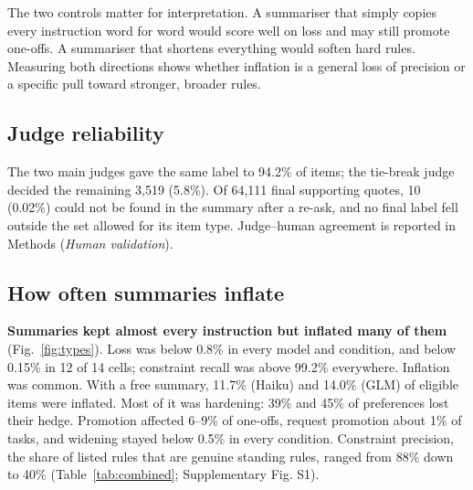 \documentclass[fleqn,10pt]{wlscirep}
\begin{document}
The two controls matter for interpretation. A summariser that simply copies every instruction word for word would score well on loss and may still promote one-offs. A summariser that shortens everything would soften hard rules. Measuring both directions shows whether inflation is a general loss of precision or a specific pull toward stronger, broader rules.

\subsection*{Judge reliability}

The two main judges gave the same label to 94.2\% of items; the tie-break judge decided the remaining 3,519 (5.8\%). Of 64,111 final supporting quotes, 10 (0.02\%) could not be found in the summary after a re-ask, and no final label fell outside the set allowed for its item type. Judge--human agreement is reported in Methods (\emph{Human validation}).

\subsection*{How often summaries inflate}

\textbf{Summaries kept almost every instruction but inflated many of them} (Fig.~\ref{fig:types}). Loss was below 0.8\% in every model and condition, and below 0.15\% in 12 of 14 cells; constraint recall was above 99.2\% everywhere. Inflation was common. With a free summary, 11.7\% (Haiku) and 14.0\% (GLM) of eligible items were inflated. Most of it was hardening: 39\% and 45\% of preferences lost their hedge. Promotion affected 6--9\% of one-offs, request promotion about 1\% of tasks, and widening stayed below 0.5\% in every condition. Constraint precision, the share of listed rules that are genuine standing rules, ranged from 88\% down to 40\% (Table~\ref{tab:combined}; Supplementary Fig. S1).
\end{document}
